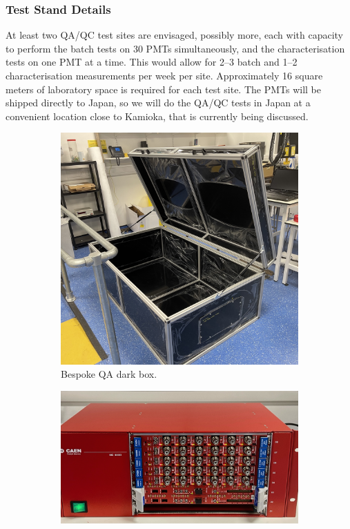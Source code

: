 \documentclass[12pt,a4paper]{article}
\begin{document}
\subsubsection{Test Stand Details}
At least two QA/QC test sites are envisaged, possibly more, each with capacity to perform the batch tests on 30 PMTs simultaneously, and the characterisation tests on one PMT at a time. This would allow for 2--3 batch and 1--2 characterisation measurements per week per site. Approximately 16 square meters of laboratory space is required for each test site. The PMTs will be shipped directly to Japan, so we will do the QA/QC tests in Japan at a convenient location close to Kamioka, that is currently being discussed.  

\begin{figure}[!htb]
\centering
\begin{subfigure}{.49\textwidth}
  \centering
  \includegraphics[width=1.\linewidth]{figures/QA_boxes.jpg}
  \caption{Bespoke QA dark box.}
  \label{fig:QA_box}
\end{subfigure}%
\hfill
\begin{subfigure}{.49\textwidth}
  \centering
  \includegraphics[width=1.\linewidth]{figures/QA_electronics.jpg}

\end{subfigure}
\end{figure}
\end{document}
